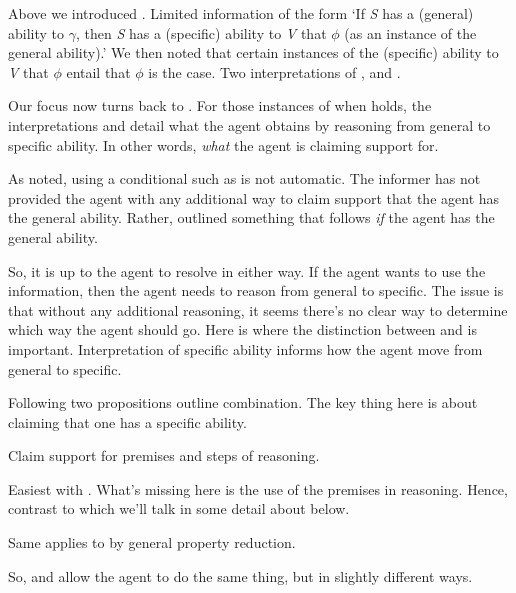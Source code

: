 \begin{note}[Summarising]
  Above we introduced \gsi{}.
  Limited information of the form `If \emph{S} has a (general) ability to \(\gamma\), then \emph{S} has a (specific) ability to \emph{V} that \(\phi\) (as an instance of the general ability).'
  We then noted that certain instances of the (specific) ability to \emph{V} that \(\phi\) entail that \(\phi\) is the case.
  Two interpretations of , \AR{} and \WR{}.

  Our focus now turns back to \gsi{}.
  For those instances of \gsi{} when  holds, the interpretations \AR{} and \WR{} detail what the agent obtains by reasoning from general to specific ability.
  In other words, \emph{what} the agent is claiming support for.

  As noted, using a conditional such as \gsi{} is not automatic.
  The informer has not provided the agent with any additional way to claim support that the agent has the general ability.
  Rather, outlined something that follows \emph{if} the agent has the general ability.

  So, it is up to the agent to resolve in either way.
  If the agent wants to use the information, then the agent needs to reason from general to specific.
  The issue is that without any additional reasoning, it seems there's no clear way to determine which way the agent should go.
  Here is where the distinction between \AR{} and \WR{} is important.
  Interpretation of specific ability informs how the agent move from general to specific.

  Following two propositions outline combination.
  {
    \color{red}
    The key thing here is about claiming that one has a specific ability.
  }
\end{note}

\begin{note}
  Claim support for premises and steps of reasoning.

  Easiest with \WR{}.
  What's missing here is the use of the premises in reasoning.
  Hence, contrast to \ESU{} which we'll talk in some detail about below.

  Same applies to \AR{} by general property reduction.

  So, \AR{} and \WR{} allow the agent to do the same thing, but in slightly different ways.
\end{note}

